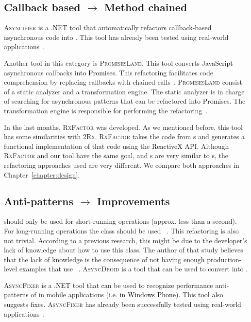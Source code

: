 \documentclass[type=bsc,accentcolor=tud9c]{tudthesis}
\newcommand{\framework}[1]{\textcolor{black}{#1}}
\newcommand{\toolcore}{\textsc{2Rx}}
\begin{document}
\subsection{Callback based $\rightarrow$ Method chained}
\textsc{Asyncifier} is a \framework{.NET} tool that automatically refactors callback-based asynchronous code into . This tool has already been tested using real-world applications~\cite{paperAsyncMobile}.

Another tool in this category is \textsc{PromisesLand}. This tool converts \framework{JavaScript} asynchronous callbacks into \framework{Promises}. This refactoring facilitates code comprehension by replacing callbacks with chained calls~\cite{thesisJavaScript}. \textsc{PromisesLand} consist of a static analyzer and a transformation engine. The static analyzer is in charge of searching for asynchronous patterns that can be refactored into \framework{Promises}. The transformation engine is responsible for performing the refactoring~\cite{thesisJavaScript}.

In the last months, \textsc{RxFactor} was developed. As we mentioned before, this tool has some similarities with \toolcore{}. \textsc{RxFactor} takes the code from s and generates a functional implementation of that code using the \framework{ReactiveX} API. Although \textsc{RxFactor} and our tool have the same goal, and s are very similar to s, the refactoring approaches used are very different. We compare both approaches in Chapter~\ref{chapter:design}.

\subsection{Anti-patterns $\rightarrow$ Improvements}
 should only be used for short-running operations (approx. less than a second). For long-running operations the class  should be used ~\cite{paperStudyRefactoring}. This refactoring is also not trivial. According to a previous research, this might be due to the developer's lack of knowledge about how to use this class. The author of that study believes that the lack of knowledge is the consequence of not having enough production-level examples that use ~\cite{paperStudyRefactoring}. \textsc{AsyncDroid} is a tool that can be used to convert  into .

\textsc{AsyncFixer} is a \framework{.NET} tool that can be used to recognize performance anti-patterns of  in mobile applications (i.e. in \framework{Windows Phone}). This tool also suggests fixes. \textsc{AsyncFixer} has already been successfully tested using real-world applications~\cite{paperAsyncMobile}.
\end{document}
